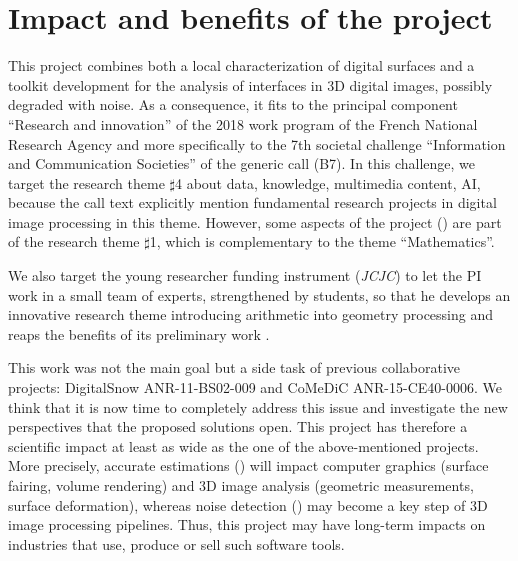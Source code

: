 \section{Impact and benefits of the project}
\label{sec:impact}




This project combines both a local characterization of digital surfaces 
and a toolkit development for the analysis of interfaces in 3D digital images, 
possibly degraded with noise. 
As a consequence, it fits to the principal component ``Research and innovation''
of the 2018 work program of the French National Research Agency 
and more specifically to the 7th societal challenge ``Information and Communication Societies''
of the generic call (B7).    
In this challenge, we target the research theme $\sharp$4 about data, knowledge, multimedia content, AI, 
because the call text explicitly mention fundamental research projects in digital image processing in this theme. However, some aspects of the project (\wpPattern) are part of the research theme $\sharp$1, 
which is complementary to the theme ``Mathematics''.    

We also target the young researcher funding instrument (\emph{JCJC}) 
to let the PI work in a small team of experts, strengthened by students, so that
he develops an innovative research theme introducing arithmetic into geometry processing and
reaps the benefits of its preliminary work \cite{LPRJMIV2017}. 


This work was not the main goal but a side task of previous collaborative projects: 
DigitalSnow ANR-11-BS02-009 and CoMeDiC ANR-15-CE40-0006. 
We think that it is now time to completely address this issue 
and investigate the new perspectives that the proposed solutions open. 
This project has therefore a scientific impact at least as wide as the one of the above-mentioned projects. 
More precisely, accurate estimations (\wpEstim)
will impact computer graphics (surface fairing, volume rendering)
and 3D image analysis (geometric measurements, surface deformation), 
whereas noise detection (\wpScale) may become a key step of 3D image processing pipelines.  
Thus, this project may have long-term impacts on industries that use, produce or sell such software tools. 

